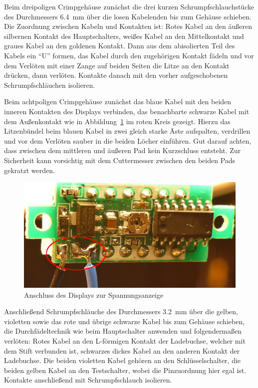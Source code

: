 \documentclass[paper=a4, open=any, numbers=noenddot]{scrbook}
\begin{document}
				Beim dreipoligen Crimpgehäuse zunächst die drei kurzen Schrumpfschlauchstücke des Durchmessers \SI{6,4}{\milli\metre} über die losen Kabelenden bis zum Gehäuse schieben. Die Zuordnung zwischen Kabeln und Kontakten ist: Rotes Kabel an den äußeren silbernen Kontakt des Hauptschalters, weißes Kabel an den Mittelkontakt und graues Kabel an den goldenen Kontakt. Dann aus dem abisolierten Teil des Kabels ein \enquote{U} formen, das Kabel durch den zugehörigen Kontakt fädeln und vor dem Verlöten mit einer Zange auf beiden Seiten die Litze an den Kontakt drücken, dann verlöten. Kontakte danach mit den vorher aufgeschobenen Schrumpfschläuchen isolieren.

				Beim achtpoligen Crimpgehäuse zunächst das blaue Kabel mit den beiden inneren Kontakten des Displays verbinden, das benachbarte schwarze Kabel mit dem Außenkontakt wie in Abbildung~\ref{fig:displayloetung} im roten Kreis gezeigt. Hierzu das Litzenbündel beim blauen Kabel in zwei gleich starke Äste aufspalten, verdrillen und vor dem Verlöten sauber in die beiden Löcher einführen. Gut darauf achten, dass zwischen dem mittleren und äußeren Pad kein Kurzschluss entsteht. Zur Sicherheit kann vorsichtig mit dem Cuttermesser zwischen den beiden Pads gekratzt werden.

				\begin{figure}
					\centering\includegraphics[width=.5\textwidth]{Bilder/displayloetung}
					\caption{Anschluss des Displays zur Spannungsanzeige}
					\label{fig:displayloetung}
				\end{figure}

				Anschließend Schrumpfschläuche des Durchmessers \SI{3,2}{\milli\metre} über die gelben, violetten sowie das rote und übrige schwarze Kabel bis zum Gehäuse schieben, die Durchfädeltechnik wie beim Hauptschalter anwenden und folgendermaßen verlöten: Rotes Kabel an den L-förmigen Kontakt der Ladebuchse, welcher mit dem Stift verbunden ist, schwarzes dickes Kabel an den anderen Kontakt der Ladebuchse. Die beiden violetten Kabel gehören an den Schlüsselschalter, die beiden gelben Kabel an den Testschalter, wobei die Pinzuordnung hier egal ist. Kontakte anschließend mit Schrumpfschlauch isolieren.
\end{document}
